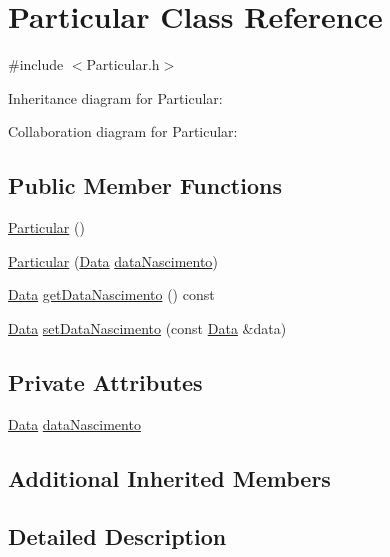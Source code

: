 \hypertarget{class_particular}{\section{Particular Class Reference}
\label{class_particular}
}


{\ttfamily \#include $<$Particular.\+h$>$}



Inheritance diagram for Particular\+:


Collaboration diagram for Particular\+:
\subsection*{Public Member Functions}
\begin{DoxyCompactItemize}
\item 
\hyperlink{class_particular_ac348d7cd078bbc184cf12f7ac8c7e589}{Particular} ()
\item 
\hyperlink{class_particular_abca8f23b90194f4f375083c8492e16d9}{Particular} (\hyperlink{class_data}{Data} \hyperlink{class_particular_ac1e89ce3d018c9d22249bdd0393988a8}{data\+Nascimento})
\item 
\hyperlink{class_data}{Data} \hyperlink{class_particular_abca7b66ae807bf92634beedb2a2a7715}{get\+Data\+Nascimento} () const 
\item 
\hyperlink{class_data}{Data} \hyperlink{class_particular_a5651a688db9efc92ae13a3ece5414077}{set\+Data\+Nascimento} (const \hyperlink{class_data}{Data} \&data)
\end{DoxyCompactItemize}
\subsection*{Private Attributes}
\begin{DoxyCompactItemize}
\item 
\hyperlink{class_data}{Data} \hyperlink{class_particular_ac1e89ce3d018c9d22249bdd0393988a8}{data\+Nascimento}
\end{DoxyCompactItemize}
\subsection*{Additional Inherited Members}


\subsection{Detailed Description}


